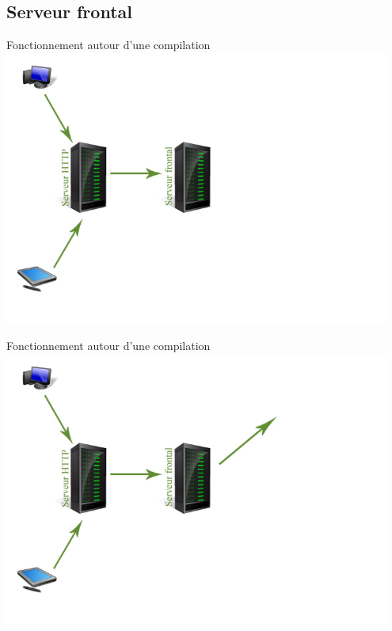 \documentclass{beamer}
\begin{document}
\subsection{Serveur frontal}
\begin{frame}{Fonctionnement autour d'une compilation}
 	\includegraphics[width=0.95\textwidth]{./images/step3}
\end{frame}
\begin{frame}{Fonctionnement autour d'une compilation}
 	\includegraphics[width=0.95\textwidth]{./images/step4}
\end{frame}
\end{document}
